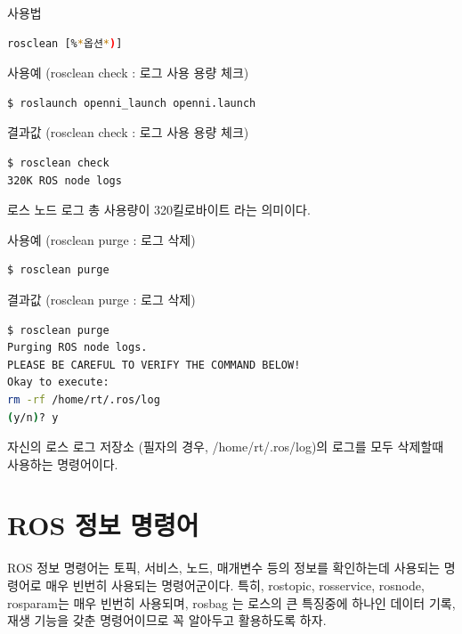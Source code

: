\setcounter{num}{0}

\vspace{\baselineskip}
\noindent
{}\circled{\thenum} 사용법
\begin{lstlisting}[language=bash]
rosclean [%*옵션*)]
\end{lstlisting}

\noindent
{}\circled{\thenum} 사용예 (rosclean check : 로그 사용 용량 체크)
\begin{lstlisting}[language=bash]
$ roslaunch openni_launch openni.launch 
\end{lstlisting}

\noindent
{}\circled{\thenum} 결과값 (rosclean check : 로그 사용 용량 체크)
\begin{lstlisting}[language=bash]
$ rosclean check
320K ROS node logs
\end{lstlisting}

\noindent
로스 노드 로그 총 사용량이 320킬로바이트 라는 의미이다.

\vspace{\baselineskip}
\noindent
{}\circled{\thenum} 사용예 (rosclean purge : 로그 삭제)
\begin{lstlisting}[language=bash]
$ rosclean purge
\end{lstlisting}

\noindent
{}\circled{\thenum} 결과값 (rosclean purge : 로그 삭제)
\begin{lstlisting}[language=bash]
$ rosclean purge 
Purging ROS node logs.
PLEASE BE CAREFUL TO VERIFY THE COMMAND BELOW!
Okay to execute:
rm -rf /home/rt/.ros/log
(y/n)? y
\end{lstlisting}

\noindent
자신의 로스 로그 저장소 (필자의 경우, /home/rt/.ros/log)의 로그를 모두 삭제할때 사용하는 명령어이다.

\section{ROS 정보 명령어}

ROS 정보 명령어는 토픽, 서비스, 노드, 매개변수 등의 정보를 확인하는데 사용되는 명령어로 매우 빈번히 사용되는 명령어군이다. 특히, rostopic, rosservice, rosnode, rosparam는 매우 빈번히 사용되며, rosbag 는 로스의 큰 특징중에 하나인 데이터 기록, 재생 기능을 갖춘 명령어이므로 꼭 알아두고 활용하도록 하자.

